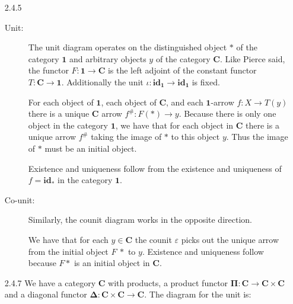 \documentclass{article}
\newcommand{\one}{\mathbf{1}}
\newcommand{\cat}{\mathbf{C}}
\newcommand{\id}{\mathbf{id}}
\newcommand{\pifun}{\mathbf{\Pi}}
\newcommand{\diagfun}{\mathbf{\Delta}}
\begin{document}
\begin{enumerate}
\item [2.4.5]
  \begin{description}
  \item [Unit:]
    The unit diagram operates on the distinguished object $*$ of the category $\one$ and arbitrary objects $y$ of the category $\cat$.
    Like Pierce said, the functor $F : \one \rightarrow \cat$ is the left adjoint of the constant functor $T : \cat \rightarrow \one$.
    Additionally the unit $\iota : \id_\one \rightarrow \id_\one$ is fixed.
    \begin{center}
    \end{center}
    For each object of $\one$, each object of $\cat$, and each $\one$-arrow $f: X \rightarrow T(y)$ there is a unique $\cat$ arrow $f^{\#} : F(*) \rightarrow y$.
    Because there is only one object in the category $\one$, we have that for each object in $\cat$ there is a unique arrow $f^{\#}$ taking the image of $*$ to this object $y$.
    Thus the image of $*$ must be an initial object.

    Existence and uniqueness follow from the existence and uniqueness of $f = \id_*$ in the category $\one$.

  \vfill{}
  \item [Co-unit:]
    Similarly, the counit diagram works in the opposite direction.
    \begin{center}
    \end{center}
    We have that for each $y \in \cat$ the counit $\varepsilon$ picks out the unique arrow from the initial object $F~*$ to $y$.
    Existence and uniqueness follow because $F*$ is an initial object in $\cat$.
  \end{description}
  \vfill{}
\newpage
\item[2.4.7]
  We have a category $\cat$ with products, a product functor $\pifun : \cat \rightarrow \cat \times \cat$ and a diagonal functor $\diagfun : \cat \times \cat \rightarrow \cat$.
  The diagram for the unit is:
  \begin{center}
\end{center}
\end{enumerate}
\end{document}
